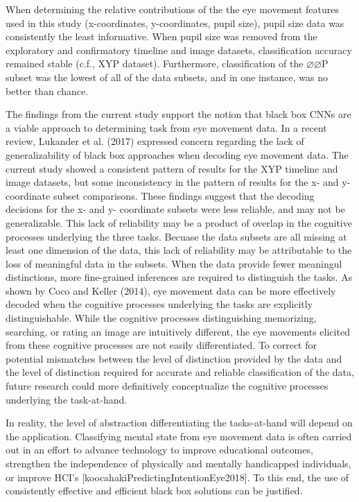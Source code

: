 \documentclass[
  english,
  man,floatsintext]{apa6}
\begin{document}
When determining the relative contributions of the the eye movement features used in this study (x-coordinates, y-coordinates, pupil size), pupil size data was consistently the least informative. When pupil size was removed from the exploratory and confirmatory timeline and image datasets, classification accuracy remained stable (c.f., XYP dataset). Furthermore, classification of the \(\varnothing\varnothing\)P subset was the lowest of all of the data subsets, and in one instance, was no better than chance.

The findings from the current study support the notion that black box CNNs are a viable approach to determining task from eye movement data. In a recent review, Lukander et al. (2017) expressed concern regarding the lack of generalizability of black box approaches when decoding eye movement data. The current study showed a consistent pattern of results for the XYP timeline and image datasets, but some inconsistency in the pattern of results for the x- and y- coordinate subset comparisons. These findings suggest that the decoding decisions for the x- and y- coordinate subsets were less reliable, and may not be generalizable. This lack of reliability may be a product of overlap in the cognitive processes underlying the three tasks. Becuase the data subsets are all missing at least one dimension of the data, this lack of reliability may be attributable to the loss of meaningful data in the subsets. When the data provide fewer meaningul distinctions, more fine-grained inferences are required to distinguish the tasks. As shown by Coco and Keller (2014), eye movement data can be more effectively decoded when the cognitive processes underlying the tasks are explicitly distinguishable. While the cognitive processes distinguishing memorizing, searching, or rating an image are intuitively different, the eye movements elicited from these cognitive processes are not easily differentiated. To correct for potential mismatches between the level of distinction provided by the data and the level of distinction required for accurate and reliable classification of the data, future research could more definitively conceptualize the cognitive processes underlying the task-at-hand.

In reality, the level of abstraction differentiating the tasks-at-hand will depend on the application. Classifying mental state from eye movement data is often carried out in an effort to advance technology to improve educational outcomes, strengthen the independence of physically and mentally handicapped individuals, or improve HCI's {[}koocahakiPredictingIntentionEye2018{]}. To this end, the use of consistently effective and efficient black box solutions can be justified.
\end{document}
